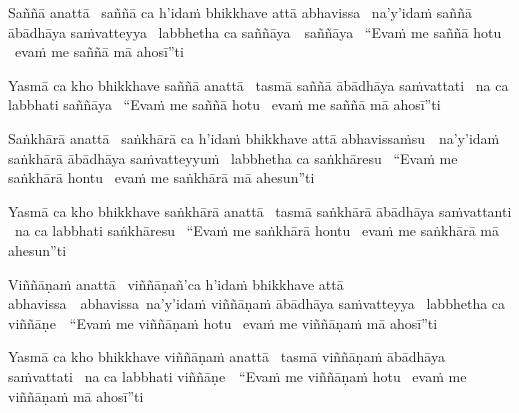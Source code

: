 \ifbsixversion\clearpage\fi

\begin{pali-hang}
  Saññā anattā \breathmark\ saññā ca h'idaṁ bhikkhave attā abhavissa \breathmark\ na'y'idaṁ saññā ābādhāya saṁvatteyya \breathmark\ labbhetha ca \ifbsixversion \mbox{saññāya}~\breathmark\ \else saññāya \breathmark\ \fi ``Evaṁ me saññā hotu \breathmark\ evaṁ me saññā mā ahosī''ti
\end{pali-hang}
\begin{pali-hangtogether}
  Yasmā ca kho bhikkhave saññā anattā \breathmark\ tasmā saññā ābādhāya saṁvattati \breathmark\ na ca labbhati saññāya \breathmark\ ``Evaṁ me saññā hotu \breathmark\ evaṁ me saññā mā ahosī''ti
\end{pali-hangtogether}

\begin{pali-hang}
  Saṅkhārā anattā \breathmark\ saṅkhārā ca h'idaṁ bhikkhave attā \mbox{abhavissaṁsu}~\breathmark\ na'y'idaṁ saṅkhārā ābādhāya saṁvatteyyuṁ \breathmark\ labbhetha ca saṅkhāresu \breathmark\ ``Evaṁ me saṅkhārā hontu \breathmark\ evaṁ me saṅkhārā mā ahesun''ti
\end{pali-hang}
\begin{pali-hangtogether}
  Yasmā ca kho bhikkhave saṅkhārā anattā \breathmark\ tasmā saṅkhārā ābādhāya saṁvattanti \breathmark\ na ca labbhati saṅkhāresu \breathmark\ ``Evaṁ me saṅkhārā hontu \breathmark\ evaṁ me saṅkhārā mā ahesun''ti
\end{pali-hangtogether}

\begin{pali-hang}
  Viññāṇaṁ anattā \breathmark\ viññāṇañ'ca h'idaṁ bhikkhave attā \ifbsixversion \mbox{abhavissa}~\breathmark\ \else abhavissa\breathmark\ \fi na'y'idaṁ viññāṇaṁ ābādhāya saṁvatteyya \breathmark\ labbhetha ca \mbox{viññāṇe}~\breathmark\ ``Evaṁ me viññāṇaṁ hotu \breathmark\ evaṁ me viññāṇaṁ mā ahosī''ti
\end{pali-hang}
\begin{pali-hangtogether}
  Yasmā ca kho bhikkhave viññāṇaṁ anattā \breathmark\ tasmā viññāṇaṁ ābādhāya saṁvattati \breathmark\ na ca labbhati \mbox{viññāṇe}~\breathmark\ ``Evaṁ me viññāṇaṁ hotu \breathmark\ evaṁ me viññāṇaṁ mā ahosī''ti
\end{pali-hangtogether}

